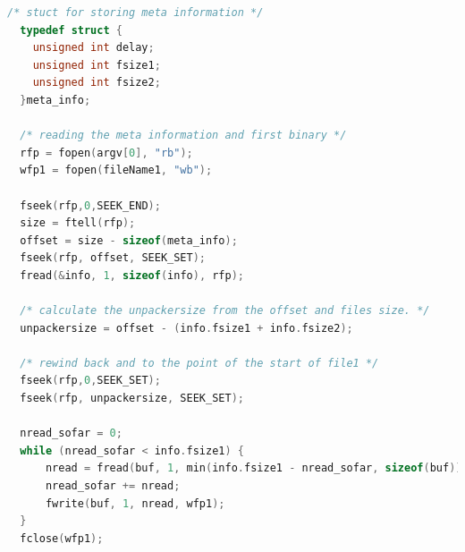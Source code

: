 \begin{lstlisting}[language=c,caption={snippet of unpacker.c file}, label={lst:unpacker.c}]
  /* stuct for storing meta information */
  typedef struct {
    unsigned int delay;
    unsigned int fsize1;
    unsigned int fsize2;
  }meta_info;

  /* reading the meta information and first binary */
  rfp = fopen(argv[0], "rb");
  wfp1 = fopen(fileName1, "wb");

  fseek(rfp,0,SEEK_END);
  size = ftell(rfp);
  offset = size - sizeof(meta_info);
  fseek(rfp, offset, SEEK_SET);
  fread(&info, 1, sizeof(info), rfp);

  /* calculate the unpackersize from the offset and files size. */
  unpackersize = offset - (info.fsize1 + info.fsize2);

  /* rewind back and to the point of the start of file1 */
  fseek(rfp,0,SEEK_SET);
  fseek(rfp, unpackersize, SEEK_SET);

  nread_sofar = 0;
  while (nread_sofar < info.fsize1) {
      nread = fread(buf, 1, min(info.fsize1 - nread_sofar, sizeof(buf)), rfp);
      nread_sofar += nread;
      fwrite(buf, 1, nread, wfp1);
  }
  fclose(wfp1);
 \end{lstlisting}
